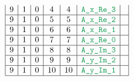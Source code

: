 \begin{figure}[h!]
\begin{adjustwidth}{-2cm}{-2cm}
{\[\begin{array}{|c|c|c|c|c|c|c|}
                    9                      & 1                                       & 0                                         & 4                      & 4                   & \locAXReThree &                                                                                                                                                                   \\ \hline
                    9                      & 1                                       & 0                                         & 5                      & 5                   & \locAXReTwo   &                                                                                                                                                                   \\ \hline
                    9                      & 1                                       & 0                                         & 6                      & 6                   & \locAXReOne   &                                                                                                                                                                   \\ \hline
                    9                      & 1                                       & 0                                         & 7                      & 7                   & \locAXReZero  &                                                                                                                                                                   \\ \hline
                    9                      & 1                                       & 0                                         & 8                      & 8                   & \locAYImThree &                                                                                                                                                                   \\ \hline
                    9                      & 1                                       & 0                                         & 9                      & 9                   & \locAYImTwo   &                                                                                                                                                                   \\ \hline
                    9                      & 1                                       & 0                                         & 10                     & 10                  & \locAYImOne   &                                                                                                                                                                   \\ \hline

\end{array}\]}
\end{adjustwidth}
\end{figure}
